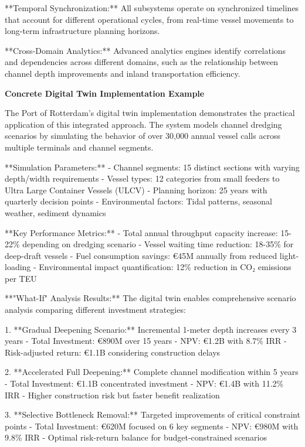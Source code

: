 \documentclass{article}
\begin{document}
**Temporal Synchronization:** All subsystems operate on synchronized timelines that account for different operational cycles, from real-time vessel movements to long-term infrastructure planning horizons.

**Cross-Domain Analytics:** Advanced analytics engines identify correlations and dependencies across different domains, such as the relationship between channel depth improvements and inland transportation efficiency.

\textbf{Concrete Digital Twin Implementation Example}

The Port of Rotterdam's digital twin implementation demonstrates the practical application of this integrated approach. The system models channel dredging scenarios by simulating the behavior of over 30,000 annual vessel calls across multiple terminals and channel segments.

**Simulation Parameters:**
- Channel segments: 15 distinct sections with varying depth/width requirements
- Vessel types: 12 categories from small feeders to Ultra Large Container Vessels (ULCV)
- Planning horizon: 25 years with quarterly decision points
- Environmental factors: Tidal patterns, seasonal weather, sediment dynamics

**Key Performance Metrics:**
- Total annual throughput capacity increase: 15-22\% depending on dredging scenario
- Vessel waiting time reduction: 18-35\% for deep-draft vessels
- Fuel consumption savings: €45M annually from reduced light-loading
- Environmental impact quantification: 12\% reduction in CO₂ emissions per TEU

**"What-If" Analysis Results:**
The digital twin enables comprehensive scenario analysis comparing different investment strategies:

1. **Gradual Deepening Scenario:** Incremental 1-meter depth increases every 3 years
   - Total Investment: €890M over 15 years
   - NPV: €1.2B with 8.7\% IRR
   - Risk-adjusted return: €1.1B considering construction delays

2. **Accelerated Full Deepening:** Complete channel modification within 5 years  
   - Total Investment: €1.1B concentrated investment
   - NPV: €1.4B with 11.2\% IRR
   - Higher construction risk but faster benefit realization

3. **Selective Bottleneck Removal:** Targeted improvements of critical constraint points
   - Total Investment: €620M focused on 6 key segments  
   - NPV: €980M with 9.8\% IRR
   - Optimal risk-return balance for budget-constrained scenarios
\end{document}
